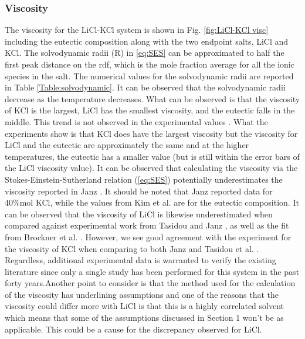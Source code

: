 \documentclass[review]{elsarticle}
\begin{document}
\subsubsection{Viscosity}
The viscosity for the LiCl-KCl system is shown in Fig. \ref{fig:LiCl-KCl visc} including the eutectic composition along with the two endpoint salts, LiCl and KCl. The solvodynamic radii (R) in \cref{eq:SES} can be approximated to half the first peak distance on the rdf, which is the mole fraction average for all the ionic species in the salt. The numerical values for the solvodynamic radii are reported in Table \ref{Table:solvodynamic}. It can be observed that the solvodynamic radii decrease as the temperature decreases. What can be observed is that the viscosity of KCl is the largest, LiCl has the smallest viscosity, and the eutectic falls in the middle. This trend is not observed in the experimental values \cite{janz_visc,janz_nist,janz_osti,kim2012high,brockner1975high,Tasidou}. What the experiments show is that KCl does have the largest viscosity but the viscosity for LiCl and the eutectic are approximately the same and at the higher temperatures, the eutectic has a smaller value (but is still within the error bars of the LiCl viscosity value). It can be observed that calculating the viscosity via the Stokes-Einstein-Sutherland relation (\cref{eq:SES}) potentially underestimates the viscosity reported in Janz \cite{janz_visc}. It should be noted that Janz reported data for 40\%mol KCl, while the values from Kim et al. \cite{kim2012high} are for the eutectic composition. It can be observed that the viscosity of LiCl is likewise underestimated when compared against experimental work from Tasidou \cite{tadano2014anharmonic} and Janz \cite{janz_nist,janz_osti}, as well as the fit from Brockner et al. \cite{brockner1975high}. However, we see good agreement with the experiment for the viscosity of KCl when comparing to both Janz \cite{janz_nist} and Tasidou et al. \cite{Tasidou}. Regardless, additional experimental data is warranted to verify the existing literature since only a single study has been performed for this system in the past forty years.Another point to consider is that the method used for the calculation of the viscosity has underlining assumptions and one of the reasons that the viscosity could differ more with LiCl is that this is a highly correlated solvent which means that some of the assumptions discussed in Section 1 won't be as applicable. This could be a cause for the discrepancy observed for LiCl.
\end{document}
